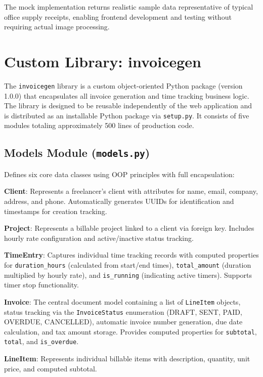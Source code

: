 \documentclass[conference]{IEEEtran}
\begin{document}
The mock implementation returns realistic sample data representative of typical office supply receipts, enabling frontend development and testing without requiring actual image processing.

\section{Custom Library: invoicegen}

The \texttt{invoicegen} library is a custom object-oriented Python package (version 1.0.0) that encapsulates all invoice generation and time tracking business logic. The library is designed to be reusable independently of the web application and is distributed as an installable Python package via \texttt{setup.py}. It consists of five modules totaling approximately 500 lines of production code.

\subsection{Models Module (\texttt{models.py})}

Defines six core data classes using OOP principles with full encapsulation:

\textbf{Client}: Represents a freelancer's client with attributes for name, email, company, address, and phone. Automatically generates UUIDs for identification and timestamps for creation tracking.

\textbf{Project}: Represents a billable project linked to a client via foreign key. Includes hourly rate configuration and active/inactive status tracking.

\textbf{TimeEntry}: Captures individual time tracking records with computed properties for \texttt{duration\_hours} (calculated from start/end times), \texttt{total\_amount} (duration multiplied by hourly rate), and \texttt{is\_running} (indicating active timers). Supports timer stop functionality.

\textbf{Invoice}: The central document model containing a list of \texttt{LineItem} objects, status tracking via the \texttt{InvoiceStatus} enumeration (DRAFT, SENT, PAID, OVERDUE, CANCELLED), automatic invoice number generation, due date calculation, and tax amount storage. Provides computed properties for \texttt{subtotal}, \texttt{total}, and \texttt{is\_overdue}.

\textbf{LineItem}: Represents individual billable items with description, quantity, unit price, and computed subtotal.
\end{document}

